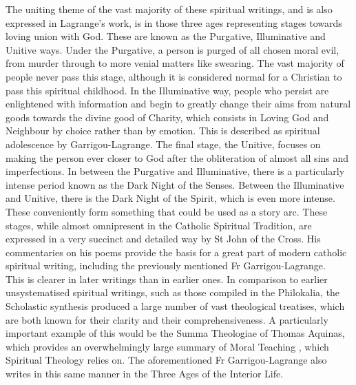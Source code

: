 \documentclass[11pt]{article}
\begin{document}
The uniting theme of the vast majority of these spiritual writings, and is also expressed in Lagrange's work, is in those three ages representing stages towards loving union with God. These are known as the Purgative, Illuminative and Unitive ways. Under the Purgative, a person is purged of all chosen moral evil, from murder through to more venial matters like swearing. The vast majority of people never pass this stage, although it is considered normal for a Christian to pass this spiritual childhood. In the Illuminative way, people who persist are enlightened with information and begin to greatly change their aims from natural goods towards the divine good of Charity, which consists in Loving God and Neighbour by choice rather than by emotion. This is described as spiritual adolescence by Garrigou-Lagrange. The final stage, the Unitive, focuses on making the person ever closer to God after the obliteration of almost all sins and imperfections. In between the Purgative and Illuminative, there is a particularly intense period known as the Dark Night of the Senses. Between the Illuminative and Unitive, there is the Dark Night of the Spirit, which is even more intense. These conveniently form something that could be used as a story arc. These stages, while almost omnipresent in the Catholic Spiritual Tradition, are expressed in a very succinct and detailed way by St John of the Cross. His commentaries on his poems \cite{OperaOmniaStJohnOfTheCross} provide the basis for a great part of modern catholic spiritual writing, including the previously mentioned Fr Garrigou-Lagrange.\\ 

This is clearer in later writings than in earlier ones. In comparison to earlier unsystematised spiritual writings, such as those compiled in the Philokalia\cite{1983philokalia}, the Scholastic synthesis produced a large number of vast theological treatises, which are both known for their clarity and their comprehensiveness. A particularly important example of this would be the Summa Theologiae of Thomas Aquinas, which provides an overwhelmingly large summary of Moral Teaching \cite{aquinas2014summa}, which Spiritual Theology relies on. The aforementioned Fr Garrigou-Lagrange also writes in this same manner in the Three Ages of the Interior Life.\\
\end{document}
